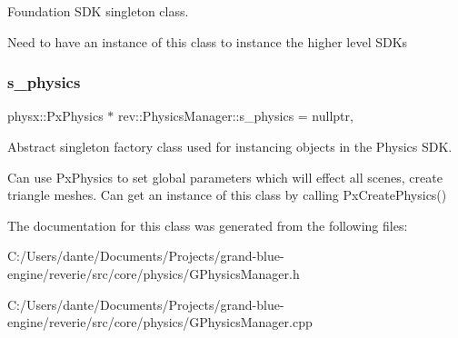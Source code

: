 Foundation S\+DK singleton class. 

Need to have an instance of this class to instance the higher level S\+D\+Ks \mbox{\label{classrev_1_1_physics_manager_abe949f3d62ca0783611f0c2a774f8a93}} 
\subsubsection{\texorpdfstring{s\_physics}{s\_physics}}
{\footnotesize\ttfamily physx\+::\+Px\+Physics $\ast$ rev\+::\+Physics\+Manager\+::s\+\_\+physics = nullptr\hspace{0.3cm}{\ttfamily [static]}, {\ttfamily [protected]}}



Abstract singleton factory class used for instancing objects in the Physics S\+DK. 

Can use Px\+Physics to set global parameters which will effect all scenes, create triangle meshes. Can get an instance of this class by calling Px\+Create\+Physics() 

The documentation for this class was generated from the following files\+:\begin{DoxyCompactItemize}
\item 
C\+:/\+Users/dante/\+Documents/\+Projects/grand-\/blue-\/engine/reverie/src/core/physics/G\+Physics\+Manager.\+h\item 
C\+:/\+Users/dante/\+Documents/\+Projects/grand-\/blue-\/engine/reverie/src/core/physics/G\+Physics\+Manager.\+cpp\end{DoxyCompactItemize}
